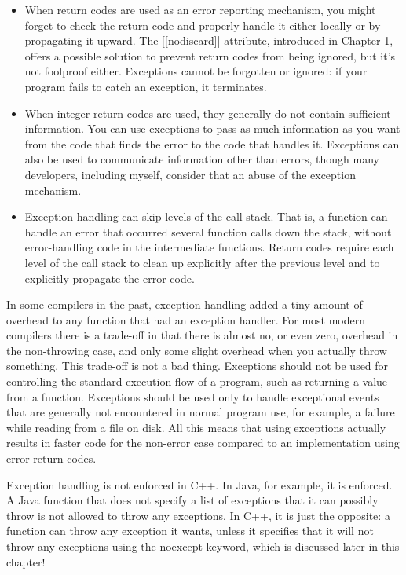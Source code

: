 \begin{itemize}
\item
When return codes are used as an error reporting mechanism, you might forget to check the return code and properly handle it either locally or by propagating it upward. The [[nodiscard]] attribute, introduced in Chapter 1, offers a possible solution to prevent return codes from being ignored, but it’s not foolproof either. Exceptions cannot be forgotten or ignored: if your program fails to catch an exception, it terminates.

\item
When integer return codes are used, they generally do not contain sufficient information. You can use exceptions to pass as much information as you want from the code that finds the error to the code that handles it. Exceptions can also be used to communicate information other than errors, though many developers, including myself, consider that an abuse of the exception mechanism.

\item
Exception handling can skip levels of the call stack. That is, a function can handle an error that occurred several function calls down the stack, without error-handling code in the intermediate functions. Return codes require each level of the call stack to clean up explicitly after the previous level and to explicitly propagate the error code.
\end{itemize}

In some compilers in the past, exception handling added a tiny amount of overhead to any function that had an exception handler. For most modern compilers there is a trade-off in that there is almost no, or even zero, overhead in the non-throwing case, and only some slight overhead when you actually throw something. This trade-off is not a bad thing. Exceptions should not be used for controlling the standard execution flow of a program, such as returning a value from a function. Exceptions should be used only to handle exceptional events that are generally not encountered in normal program use, for example, a failure while reading from a file on disk. All this means that using exceptions actually results in faster code for the non-error case compared to an implementation using error return codes.

Exception handling is not enforced in C++. In Java, for example, it is enforced. A Java function that does not specify a list of exceptions that it can possibly throw is not allowed to throw any exceptions. In C++, it is just the opposite: a function can throw any exception it wants, unless it specifies that it will not throw any exceptions using the noexcept keyword, which is discussed later in this chapter!

